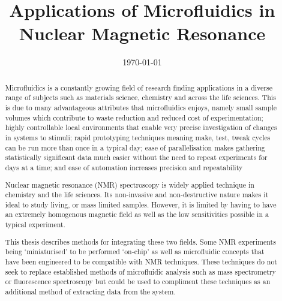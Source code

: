 \documentclass{ecsthesis}      %
\begin{document}
\frontmatter
\title      {Applications of Microfluidics in Nuclear Magnetic Resonance}
\addresses  {\groupname\\\deptname\\\univname}
\date       {\today}
\subject    {}
\keywords   {}
\maketitle
\begin{abstract}
  Microfluidics is a constantly growing field of research finding applications in a diverse range of subjects
  such as materials science, chemistry and across the life sciences. This is due to many advantageous attributes
  that microfluidics enjoys, namely small sample volumes which contribute to waste reduction and reduced cost of
  experimentation; highly controllable local environments that enable very precise investigation of changes in
  systems to stimuli; rapid prototyping techniques meaning make, test, tweak cycles can be run more than once
  in a typical day; ease of parallelisation makes gathering statistically significant data much easier without
  the need to repeat experiments for days at a time; and ease of automation increases precision and repeatability

  Nuclear magnetic resonance (NMR) spectroscopy is widely applied technique in chemistry and the life sciences.
  Its non-invasive and non-destructive nature makes it ideal to study living, or mass limited samples. However,
  it is limited by having to have an extremely homogenous magnetic field as well as the low sensitivities possible in a
  typical experiment.

  This thesis describes methods for integrating these two fields. Some NMR experiments being ‘miniaturised’ to
  be performed ‘on-chip’ as well as microfluidic concepts that have been engineered to be compatible with NMR
  techniques. These techniques do not seek to replace established methods of microfluidic analysis such as mass
  spectrometry or fluorescence spectroscopy but could be used to compliment these techniques as an additional
  method of extracting data from the system.

\end{abstract}
\tableofcontents
\listoffigures
\listoftables
\lstlistoflistings
{}
\mainmatter




%
\appendix
%


\end{document}
